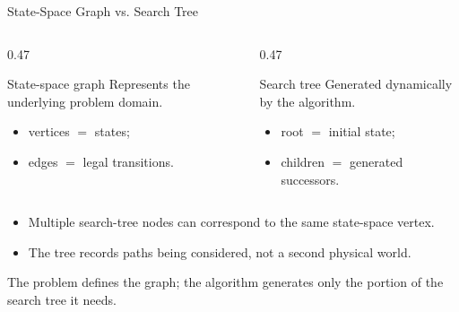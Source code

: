 \documentclass[aspectratio=169,10pt]{beamer}
\begin{document}
\begin{frame}[shrink=20]{State-Space Graph vs. Search Tree}
  \begin{columns}[T,onlytextwidth]
    \begin{column}{0.47\textwidth}
      \begin{block}{State-space graph}
        Represents the underlying problem domain.
        \begin{itemize}
          \item vertices $=$ states;
          \item edges $=$ legal transitions.
        \end{itemize}
      \end{block}
    \end{column}

    \begin{column}{0.47\textwidth}
      \begin{block}{Search tree}
        Generated dynamically by the algorithm.
        \begin{itemize}
          \item root $=$ initial state;
          \item children $=$ generated successors.
        \end{itemize}
      \end{block}
    \end{column}
  \end{columns}

  \begin{itemize}
    \item Multiple search-tree nodes can correspond to the same state-space vertex.
    \item The tree records paths being considered, not a second physical world.
  \end{itemize}

  \begin{keyidea}
    The problem defines the graph; the algorithm generates only the portion of the search tree it needs.
  \end{keyidea}
\end{frame}
\end{document}
